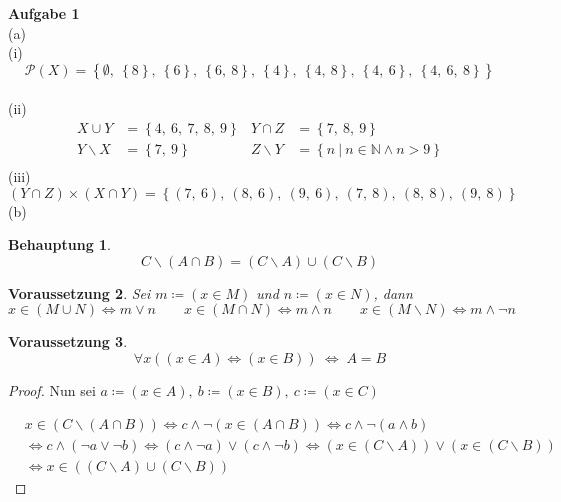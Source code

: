\documentclass[a4paper, 12pt]{scrartcl}
\theoremstyle{plain}
\newtheorem{theorem}{Behauptung}
\newtheorem{precondition}[theorem]{Voraussetzung}
\begin{document}
\textbf{Aufgabe 1}\\
(a)\\
(i)
\[ \mathcal{P}(X) = \left\{ \emptyset,
\ \left\{  8 \right\},
\ \left\{  6 \right\},
\ \left\{  6,\ 8 \right\},
\ \left\{ 4 \right\},
\ \left\{ 4,\ 8 \right\},
\ \left\{ 4,\ 6 \right\},
\ \left\{ 4,\ 6,\ 8 \right\}
 \right\} \]\\
(ii)
\begin{align*}
	X \cup Y &= \left\{ 4,\ 6,\ 7, \ 8,\ 9 \right\} & Y \cap Z &= \left\{ 7,\ 8,\ 9 \right\} \\ Y \backslash X &= \left\{ 7,\ 9 \right\} & Z \backslash Y &= \left\{ n \:\vert\: n \in \mathbb{N} \wedge n > 9 \right\} \\
\end{align*}
(iii) \[ (Y \cap Z) \times (X \cap Y) =  \left\{ (7, \ 6),\ (8, \ 6),\ (9, \ 6),\ (7, \ 8),\ (8, \ 8),\ (9, \ 8) \right\} \]
(b)\\
\begin{theorem}
	\[ C \backslash (A \cap B) = (C \backslash A) \cup (C \backslash B) \]
\end{theorem}
\begin{precondition}
Sei $ m \coloneqq (x \in M)$ und  $n \coloneqq (x \in N)$, dann
\[ x \in (M \cup N) \Leftrightarrow m \vee n \qquad x \in (M \cap N) \Leftrightarrow m \wedge n \qquad x  \in (M \backslash N) \Leftrightarrow m \wedge \neg n \]
\end{precondition}
\begin{precondition}
\[ \forall x ((x \in A) \Leftrightarrow (x \in B)) \:\Leftrightarrow\; A = B \]
\end{precondition}

\begin{proof}
	
Nun sei $a \coloneqq (x \in A), \ b \coloneqq (x \in B), \ c \coloneqq (x \in C)$

\begin{align*}
	&x \in (C \backslash (A \cap B)) \Leftrightarrow c \wedge \neg(x \in (A \cap B)) \Leftrightarrow c \wedge \neg(a \wedge b) \\
	&\Leftrightarrow c \wedge (\neg a \vee \neg b) \Leftrightarrow (c \wedge \neg a) \vee (c \wedge \neg b) \Leftrightarrow (x \in (C \backslash A)) \vee (x \in (C \backslash B)) \\
	&\Leftrightarrow x \in ((C \backslash A) \cup (C \backslash B))
\end{align*}
\end{proof}
\end{document}

